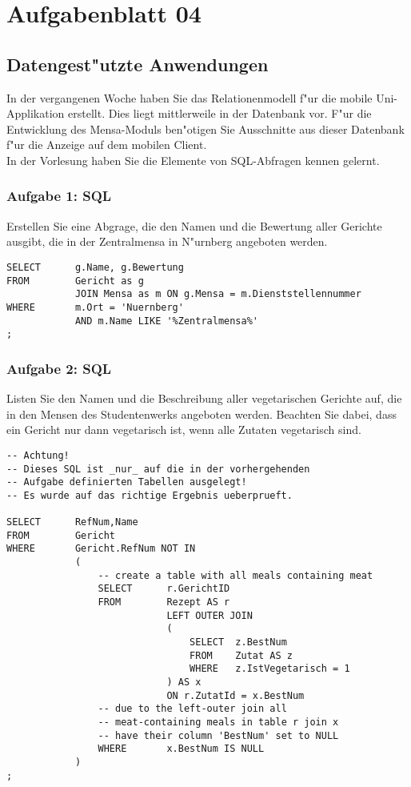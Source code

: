 

\chapter{Aufgabenblatt 04}

\section{Datengest"utzte Anwendungen}
In der vergangenen Woche haben Sie das Relationenmodell f"ur die mobile Uni-Applikation erstellt.
Dies liegt mittlerweile in der Datenbank vor.
F"ur die Entwicklung des Mensa-Moduls ben"otigen Sie Ausschnitte aus dieser Datenbank f"ur die Anzeige auf dem mobilen Client.\\
In der Vorlesung haben Sie die Elemente von SQL-Abfragen kennen gelernt.


\subsection{Aufgabe 1: SQL}
Erstellen Sie eine Abgrage, die den Namen und die Bewertung aller Gerichte ausgibt, die in der Zentralmensa in N"urnberg angeboten werden.

\lstset{style=customSQL}
\begin{lstlisting}
SELECT      g.Name, g.Bewertung
FROM        Gericht as g
            JOIN Mensa as m ON g.Mensa = m.Dienststellennummer
WHERE       m.Ort = 'Nuernberg'
            AND m.Name LIKE '%Zentralmensa%'
;
\end{lstlisting}

\subsection{Aufgabe 2: SQL}
Listen Sie den Namen und die Beschreibung aller vegetarischen Gerichte auf, die in den Mensen des Studentenwerks angeboten werden.
Beachten Sie dabei, dass ein Gericht nur dann vegetarisch ist, wenn alle Zutaten vegetarisch sind.\\

\lstset{style=customSQL}
\begin{lstlisting}
-- Achtung!
-- Dieses SQL ist _nur_ auf die in der vorhergehenden
-- Aufgabe definierten Tabellen ausgelegt!
-- Es wurde auf das richtige Ergebnis ueberprueft.

SELECT      RefNum,Name 
FROM        Gericht
WHERE       Gericht.RefNum NOT IN
            (
                -- create a table with all meals containing meat
                SELECT      r.GerichtID
                FROM        Rezept AS r
                            LEFT OUTER JOIN 
                            (
                                SELECT  z.BestNum
                                FROM    Zutat AS z
                                WHERE   z.IstVegetarisch = 1
                            ) AS x
                            ON r.ZutatId = x.BestNum
                -- due to the left-outer join all 
                -- meat-containing meals in table r join x
                -- have their column 'BestNum' set to NULL
                WHERE       x.BestNum IS NULL
            )
;
\end{lstlisting}



